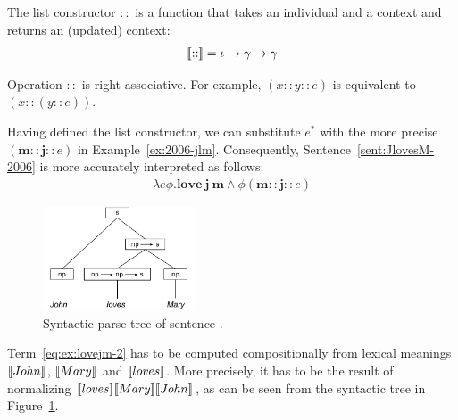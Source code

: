 \begin{notation} The list constructor $::$ is a function that takes an individual and a context and returns an (updated) context:
\begin{align} 
 [\![::]\!]  =  \iota \rightarrow \gamma \rightarrow \gamma
\end{align}
\end{notation}

\begin{remark}
Operation $::$ is right associative. For example, $(x::y::e)$ is equivalent to $(x::(y::e))$.
\end{remark}

Having defined the list constructor, we can substitute $e^*$ with the more precise $(\textbf{m} :: \textbf{j} ::{e})$ in Example~\ref{ex:2006-jlm}. Consequently, Sentence~\eqref{sent:JlovesM-2006} is more accurately interpreted as follows:
\begin{align}
\lambda e \phi. \textbf{love}  \ \textbf{j} \ \textbf{m} \land \phi (\textbf{m} :: \textbf{j} ::{e}) \label{eq:ex:lovejm-2}
\end{align}

\begin{figure}[h!]
 \centering
    \includegraphics[width=0.4\textwidth]{images/JohnLovesMary.pdf}
\caption{Syntactic parse tree of sentence .} \label{fig:JohnLovesMary}
\end{figure}

Term~\eqref{eq:ex:lovejm-2} has to be computed compositionally from lexical meanings $[\![John]\!]$, $[\![Mary]\!]$ and $[\![loves]\!]$. More precisely, it has to be the result of normalizing  $[\![loves]\!] [\![Mary]\!] [\![John]\!]$, as can be seen from the syntactic tree in Figure~\ref{fig:JohnLovesMary}. 

